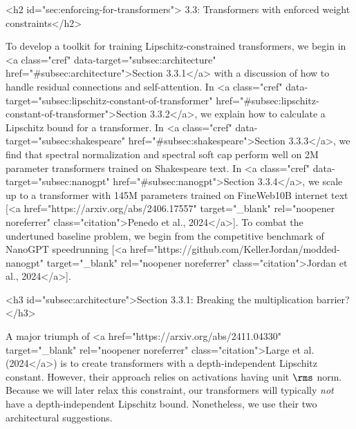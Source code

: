 <h2 id="sec:enforcing-for-transformers"> 3.3: Transformers with enforced weight constraints</h2>

To develop a toolkit for training Lipschitz-constrained transformers, we begin in <a class="cref" data-target="subsec:architecture" href="#subsec:architecture">Section 3.3.1</a> with a discussion of how to handle residual connections and self-attention. In <a class="cref" data-target="subsec:lipschitz-constant-of-transformer" href="#subsec:lipschitz-constant-of-transformer">Section 3.3.2</a>, we explain how to calculate a Lipschitz bound for a transformer. In <a class="cref" data-target="subsec:shakespeare" href="#subsec:shakespeare">Section 3.3.3</a>, we find that spectral normalization and spectral soft cap perform well on 2M parameter transformers trained on Shakespeare text. In <a class="cref" data-target="subsec:nanogpt" href="#subsec:nanogpt">Section 3.3.4</a>, we scale up to a transformer with 145M parameters trained on FineWeb10B internet text [<a href="https://arxiv.org/abs/2406.17557" target="_blank" rel="noopener noreferrer" class="citation">Penedo et al., 2024</a>]. To combat the undertuned baseline problem, we begin from the competitive benchmark of NanoGPT speedrunning [<a href="https://github.com/KellerJordan/modded-nanogpt" target="_blank" rel="noopener noreferrer" class="citation">Jordan et al., 2024</a>].

<h3 id="subsec:architecture">Section 3.3.1: Breaking the multiplication barrier?</h3>

A major triumph of <a href="https://arxiv.org/abs/2411.04330" target="_blank" rel="noopener noreferrer" class="citation">Large et al. (2024</a>) is to create transformers with a depth-independent Lipschitz constant. However, their approach relies on activations having unit $\rms$ norm. Because we will later relax this constraint, our transformers will typically \textit{not} have a depth-independent Lipschitz bound. Nonetheless, we use their two architectural suggestions.

